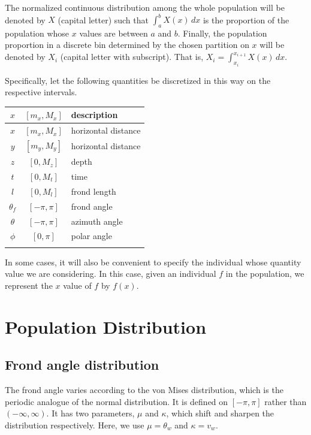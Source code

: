 \documentclass[10pt]{article}
\newenvironment{mcfig}
	{\par\medskip\noindent\minipage{\linewidth}}
	{\endminipage\par\medskip}
\begin{document}
\begin{multicols}{2}
The normalized continuous distribution among the whole population will be denoted by $X$ (capital letter) such that $\int_a^bX(x)\,dx$ is the proportion of the population whose $x$ values are between $a$ and $b$.
Finally, the population proportion in a discrete bin determined by the chosen partition on $x$ will be denoted by $X_i$ (capital letter with subscript).
That is, $X_i = \int_{x_i}^{x_{i+1}}X(x)\,dx$.

Specifically, let the following quantities be discretized in this way on the respective intervals.

\begin{mcfig}
	\centering
	\begin{tabular}{ccl} \toprule
		$x$ & $[m_x,M_x]$ & description \\
		\midrule
		$x$ & $[m_x,M_x]$ & horizontal distance \\
		$y$ & $[m_y,M_y]$ & horizontal distance \\
		$z$ & $[0,M_z]$ & depth \\
		$t$ & $[0,M_t]$ & time \\
		$l$ & $[0,M_l]$ & frond length \\
		$\theta_f$ & $[-\pi,\pi]$ & frond angle \\
		$\theta$ & $[-\pi,\pi]$ & azimuth angle \\
		$\phi$ & $[0,\pi]$ & polar angle \\
		\bottomrule \\
	\end{tabular}
\end{mcfig}

In some cases, it will also be convenient to specify the individual whose quantity value we are considering.
In this case, given an individual $f$ in the population, we represent the $x$ value of $f$ by $f(x)$.

\section{Population Distribution}
\label{sec:dist}
\subsection{Frond angle distribution}
\label{sec:angle_dist}
The frond angle varies according to the von Mises distribution, which is the periodic analogue of the normal distribution.
It is defined on $[-\pi,\pi]$ rather than $(-\infty,\infty)$.
It has two parameters, $\mu$ and $\kappa$, which shift and sharpen the distribution respectively.
Here, we use $\mu = \theta_w$ and $\kappa = v_w$.


\end{multicols}
\end{document}
